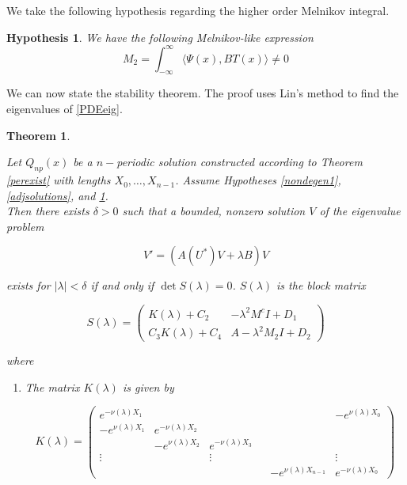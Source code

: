 \documentclass[12pt]{article}
\newtheorem{theorem}{Theorem}
\newtheorem{hypothesis}{Hypothesis}
\begin{document}
We take the following hypothesis regarding the higher order Melnikov integral.

\begin{hypothesis}\label{Melnikov2}
We have the following Melnikov-like expression
\begin{equation}
M_2 = \int_{-\infty}^\infty \langle \Psi(x), B T(x) \rangle \neq 0
\end{equation}

\end{hypothesis}

We can now state the stability theorem. The proof uses Lin's method to find the eigenvalues of \eqref{PDEeig}.


\begin{theorem}\label{PDEeigtheorem}

Let $Q_{np}(x)$ be a $n-$periodic solution constructed according to Theorem \ref{perexist} with lengths $X_0, \dots, X_{n-1}$. Assume Hypotheses \ref{nondegen1}, \ref{adjsolutions}, and \ref{Melnikov2}.\\

Then there exists $\delta > 0$ such that a bounded, nonzero solution $V$ of the eigenvalue problem 

\begin{equation}
V' = ( A(U^*)V + \lambda B)V 
\end{equation}

exists for $|\lambda| < \delta$ if and only if $\det S(\lambda) = 0$. $S(\lambda)$ is the block matrix

\begin{equation}\label{blockmatrix}
S(\lambda) = 
\begin{pmatrix}
K(\lambda) + C_2 & -\lambda^2 M^c I + D_1 \\
C_3 K(\lambda) + C_4 & A - \lambda^2 M_2 I + D_2
\end{pmatrix}
\end{equation}

where 

\begin{enumerate}

\item The matrix $K(\lambda)$ is given by

\begin{equation}
K(\lambda) = 
\begin{pmatrix}
e^{-\nu(\lambda)X_1} & & & & & -e^{\nu(\lambda)X_0} \\
-e^{\nu(\lambda)X_1} & e^{-\nu(\lambda)X_2} \\
& -e^{\nu(\lambda)X_2} & e^{-\nu(\lambda)X_3} \\
\vdots & & \vdots & &&  \vdots \\
& & & & -e^{\nu(\lambda)X_{n-1}} & e^{-\nu(\lambda)X_0} 
\end{pmatrix}
\end{equation}


\end{enumerate}
\end{theorem}
\end{document}
